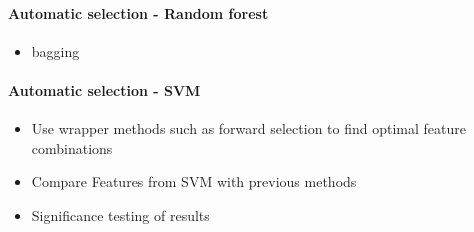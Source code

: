 \paragraph{Automatic selection - Random forest} 
\begin{itemize}
    \item bagging
\end{itemize}

\paragraph{Automatic selection - SVM} 
\begin{itemize}
    \item Use wrapper methods such as forward selection to find optimal feature
        combinations
    \item Compare Features from SVM with previous methods
    \item Significance testing of results
\end{itemize}








